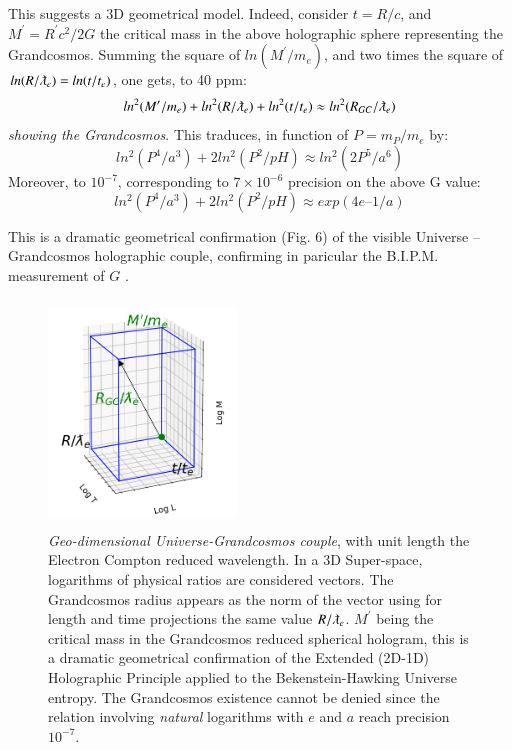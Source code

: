 \documentclass[twoside,draft]{article}
\begin{document}
\begin{sloppypar}
This suggests a 3D geometrical model. Indeed, consider $t =R/c$, and $M^{\prime} = R^{\prime} c^{2} /2G$ the critical mass in the above holographic sphere representing the Grandcosmos. Summing the square of $ln(M^{\prime}/m_{e} )$, and two times the square of $ln(R/\lambdabar_{e} ) = ln(t/t_{e} )$, one gets, to 40 ppm:
\begin{equation}
ln^{2} (M^{\prime}/m_{e} ) + ln^{2} (R/\lambdabar_{e}) + ln^2 (t/t_{e} ) \approx ln^2 (R_{GC} /\lambdabar_{e} )
\end{equation} 
\textit{showing the Grandcosmos}. This traduces, in function of $P = m_P/m_e$ by:
\begin{equation}
ln^2(P^4/a^3) + 2 ln^2(P^2/pH) \approx ln^2(2P^5/a^6)
\end{equation}
Moreover, to $10^{-7}$, corresponding to $7 \times 10^{-6}$ precision on the above G value:
\begin{equation}
ln^2(P^4/a^3) + 2 ln^2(P^2/pH) \approx exp(4e – 1/a)
\end{equation}
 
This is a dramatic geometrical confirmation (Fig. 6) of the visible Universe – Grandcosmos holographic couple, confirming in paricular the B.I.P.M. measurement of $G$ \cite{Quinn}.


\begin{figure}[h]
\centering
\includegraphics[width=5cm,height=6cm]{./figures/triaxis.png}
\caption {\textit{Geo-dimensional Universe-Grandcosmos couple}, with unit length the Electron Compton reduced wavelength. 
In a 3D Super-space, logarithms of physical ratios are considered vectors. The Grandcosmos radius appears as the norm of the vector using for length and time projections the same value $R/\lambdabar_e$.
$M^{\prime}$ being the critical mass in the Grandcosmos reduced spherical hologram, this is a dramatic geometrical confirmation of the Extended (2D-1D) Holographic Principle applied to the Bekenstein-Hawking Universe entropy. The Grandcosmos existence cannot be denied since the relation involving \textit{natural} logarithms with $e$ and $a$ reach precision $10^{-7}$.} 
\end{figure}


\end{sloppypar}
\end{document}
